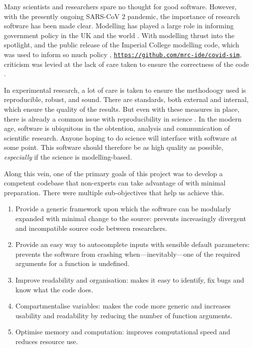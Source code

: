 Many scientists and researchers spare no thought for good software. However, with the presently ongoing SARS-CoV 2 pandemic, the importance of research software has been made clear. Modelling has played a large role in informing government policy in the UK and the world \cite{covidScotland,covidUK1,covidUK2}. With modelling thrust into the spotlight, and the public release of the Imperial College modelling code, which was used to inform so much policy \cite{covidUK2}, \href{https://github.com/mrc-ide/covid-sim}{\texttt{https://github.com/mrc-ide/covid-sim}}, criticism was levied at the lack of care taken to ensure the correctness of the code \cite{natureModelCritique}.

In experimental research, a lot of care is taken to ensure the methodoogy used is reproducible, robust, and sound. There are standards, both external and internal, which ensure the quality of the results. But even with these measures in place, there is already a common issue with reproducibility in science \cite{mede2020replication,randall2018irreproducibility,bolli2015reflections}. In the modern age, software is ubiquitous in the obtention, analysis and communication of scientific research. Anyone hoping to do science will interface with software at some point. This software should therefore be as high quality as possible, \emph{especially} if the science is modelling-based.

Along this vein, one of the primary goals of this project was to develop a competent codebase that non-experts can take advantage of with minimal preparation. There were multiple sub-objectives that help us achieve this.
\begin{enumerate}
  \item Provide a generic framework upon which the software can be modularly expanded with minimal change to the source: prevents increasingly divergent and incompatible source code between researchers.
  \item Provide an easy way to autocomplete inputs with sensible default parameters: prevents the software from crashing when---inevitably---one of the required arguments for a function is undefined.
  \item Improve readability and organisation: makes it easy to identify, fix bugs and know what the code does.
  \item Compartmentalise variables: makes the code more generic and increases usability and readability by reducing the number of function arguments.
  \item Optimise memory and computation: improves computational speed and reduces resource use.
\end{enumerate}

